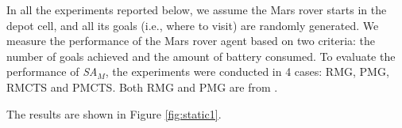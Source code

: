 \documentclass[portrait, plainsections]{sciposter}
\newcommand{\SAM}{\emph{SA}$_M$\xspace}
\newcommand{\SA}{\emph{SA}\xspace}
\begin{document}
\begin{multicols}{3}
In all the experiments reported below, we assume the Mars rover starts in the depot cell, and all its goals (i.e., where to visit) are randomly generated.
We measure the performance of the Mars rover agent based on two criteria: the number of goals achieved and the amount of battery consumed.
To evaluate the performance of \SAM, the experiments were conducted in 4 cases: RMG, PMG, RMCTS and PMCTS.
%
Both RMG and PMG are from \cite{DuffHT06}.
%
%
%
%
%


%

The results are shown in Figure \ref{fig:static1}.


\end{multicols}
\end{document}
